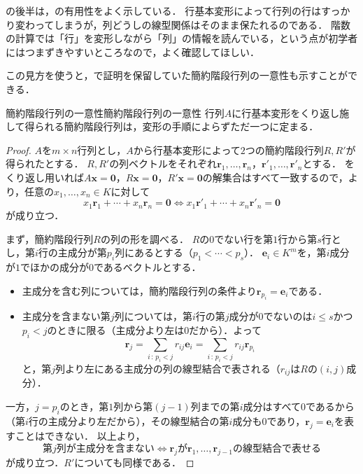 の後半は，の有用性をよく示している．
行基本変形によって行列の行はすっかり変わってしまうが，列どうしの線型関係はそのまま保たれるのである．
階数の計算では「行」を変形しながら「列」の情報を読んでいる，という点が初学者にはつまずきやすいところなので，よく確認してほしい．

この見方を使うと，で証明を保留していた簡約階段行列の一意性も示すことができる．

\begin{prop}{簡約階段行列の一意性}{簡約階段行列の一意性}
  行列$A$に行基本変形をくり返し施して得られる簡約階段行列は，変形の手順によらずただ一つに定まる．
\end{prop}

\begin{tleftbar}
\begin{proof}
  $A$を$m \times n$行列とし，$A$から行基本変形によって$2$つの簡約階段行列$R,R'$が得られたとする．
  $R,R'$の列ベクトルをそれぞれ$\bm{r}_1, \dots, \bm{r}_n$，$\bm{r}'_1, \dots, \bm{r}'_n$とする．
  をくり返し用いれば$A\bm{x} = \bm{0}$，$R\bm{x} = \bm{0}$，$R'\bm{x} = \bm{0}$の解集合はすべて一致するので，より，任意の$x_1, \dots, x_n \in K$に対して
  \begin{equation}
    x_1 \bm{r}_1 + \cdots + x_n \bm{r}_n = \bm{0}
    \iff
    x_1 \bm{r}'_1 + \cdots + x_n \bm{r}'_n = \bm{0}
    \label{eq:簡約階段行列の列の線型関係}
  \end{equation}
  が成り立つ．

  まず，簡約階段行列$R$の列の形を調べる．
  $R$の$0$でない行を第$1$行から第$s$行とし，第$i$行の主成分が第$p_i$列にあるとする（$p_1 < \cdots < p_s$）．
  $\bm{e}_i \in K^m$を，第$i$成分が$1$でほかの成分が$0$であるベクトルとする．
  \begin{itemize}
    \item 主成分を含む列については，簡約階段行列の条件より$\bm{r}_{p_i} = \bm{e}_i$である．
    \item 主成分を含まない第$j$列については，第$i$行の第$j$成分が$0$でないのは$i \le s$かつ$p_i < j$のときに限る（主成分より左は$0$だから）．よって
      \[
        \bm{r}_j = \sum_{i \,:\, p_i < j} r_{ij} \bm{e}_i = \sum_{i \,:\, p_i < j} r_{ij} \bm{r}_{p_i}
      \]
      と，第$j$列より左にある主成分の列の線型結合で表される（$r_{ij}$は$R$の$(i, j)$成分）．
  \end{itemize}
  一方，$j = p_i$のとき，第$1$列から第$(j - 1)$列までの第$i$成分はすべて$0$であるから（第$i$行の主成分より左だから），その線型結合の第$i$成分も$0$であり，$\bm{r}_j = \bm{e}_i$を表すことはできない．
  以上より，
  \[
    \text{第$j$列が主成分を含まない}
    \iff
    \text{$\bm{r}_j$が$\bm{r}_1, \dots, \bm{r}_{j-1}$の線型結合で表せる}
  \]
  が成り立つ．$R'$についても同様である．


\end{proof}
\end{tleftbar}
